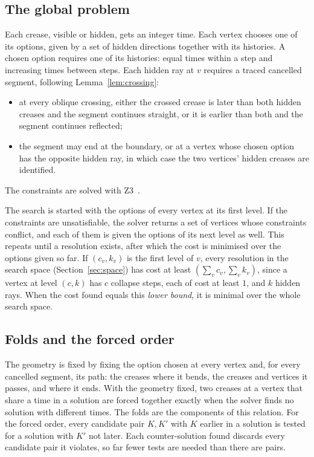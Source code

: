 \documentclass[11pt]{article}
\theoremstyle{definition}
\theoremstyle{remark}
\begin{document}
\subsection{The global problem}\label{sec:global-search}

Each crease, visible or hidden, gets an integer time. Each vertex chooses one of its options, given by a set of hidden directions together with its histories. A chosen option requires one of its histories: equal times within a step and increasing times between steps. Each hidden ray at $v$ requires a traced cancelled segment, following Lemma~\ref{lem:crossing}:
\begin{itemize}
\item at every oblique crossing, either the crossed crease is later than both hidden creases and the segment continues straight, or it is earlier than both and the segment continues reflected;
\item the segment may end at the boundary, or at a vertex whose chosen option has the opposite hidden ray, in which case the two vertices' hidden creases are identified.
\end{itemize}
The constraints are solved with Z3~\cite{z3}.

The search is started with the options of every vertex at its first level. If the constraints are unsatisfiable, the solver returns a set of vertices whose constraints conflict, and each of them is given the options of its next level as well. This repeats until a resolution exists, after which the cost is minimised over the options given so far. If $(c_v,k_v)$ is the first level of $v$, every resolution in the search space (Section~\ref{sec:space}) has cost at least $(\sum_v c_v,\sum_v k_v)$, since a vertex at level $(c,k)$ has $c$ collapse steps, each of cost at least $1$, and $k$ hidden rays. When the cost found equals this \emph{lower bound}, it is minimal over the whole search space.

\subsection{Folds and the forced order}\label{sec:analysis}

The geometry is fixed by fixing the option chosen at every vertex and, for every cancelled segment, its path: the creases where it bends, the creases and vertices it passes, and where it ends. With the geometry fixed, two creases at a vertex that share a time in a solution are forced together exactly when the solver finds no solution with different times. The folds are the components of this relation. For the forced order, every candidate pair $K,K'$ with $K$ earlier in a solution is tested for a solution with $K'$ not later. Each counter-solution found discards every candidate pair it violates, so far fewer tests are needed than there are pairs.
\end{document}
